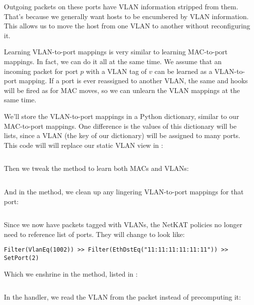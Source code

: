 Outgoing packets on these ports have VLAN information stripped from them.  That's because we generally 
want hosts to be encumbered by VLAN information.  This allows us to move the host from one VLAN to another
without reconfiguring it.  

Learning VLAN-to-port mappings is very similar to learning MAC-to-port mappings.  In fact, 
we can do it all at the
same time.  We assume that an incoming packet for port $p$ with a VLAN tag of $v$ can be learned as a 
VLAN-to-port mapping.  If a port is ever reassigned to another VLAN, the same  and
 hooks will be fired as for MAC moves, so we can unlearn the VLAN mappings at the same
time.  

We'll store the VLAN-to-port mappings in a Python dictionary, similar to our MAC-to-port mappings.  
One difference is the values of this dictionary will be lists, since a VLAN (the key of our dictionary)
will be assigned to many ports.  This code will will replace our static VLAN view in 
:

\inputminted[firstline=65]{python}{code/handling_vlans/network_information_base_dynamic.py}

Then we tweak the  method to learn both MACs and VLANs:

\inputminted[firstline=13,lastline=24]{python}{code/handling_vlans/network_information_base_dynamic.py}

And in the  method, we clean up any lingering VLAN-to-port mappings for that port:

\inputminted[firstline=55,lastline=60]{python}{code/handling_vlans/network_information_base_dynamic.py}

Since we now have packets tagged with VLANs, the NetKAT policies no longer need to reference list of ports.
They will change to look like:

\begin{verbatim}
Filter(VlanEq(1002)) >> Filter(EthDstEq("11:11:11:11:11:11")) >> SetPort(2)
\end{verbatim}

Which we enshrine in the  method, listed in 
:

\inputminted[firstline=23,lastline=29]{python}{code/handling_vlans/vlan2.py}

In the  handler, we read the VLAN from the packet instead of precomputing it:

